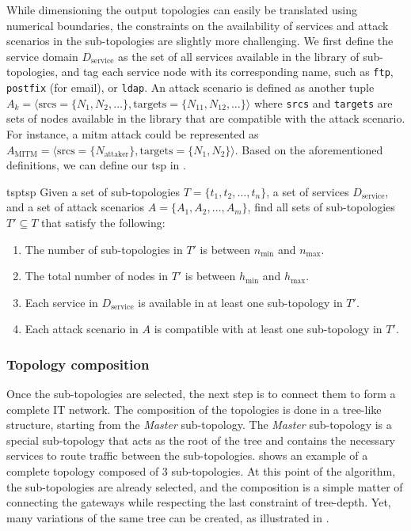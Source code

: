 While dimensioning the output topologies can easily be translated using numerical boundaries, the constraints on the availability of services and attack scenarios in the sub-topologies are slightly more challenging.
We first define the service domain $D_\text{service}$ as the set of all services available in the library of sub-topologies, and tag each service node with its corresponding name, such as \texttt{ftp}, \texttt{postfix} (for email), or \texttt{ldap}.
An attack scenario is defined as another tuple $A_k = \langle \text{srcs} = \{N_1, N_2, \ldots\}, \text{targets} = \{N_{11}, N_{12}, \ldots\} \rangle $ where \texttt{srcs} and \texttt{targets} are sets of nodes available in the library that are compatible with the attack scenario.
For instance, a \gls{mitm} attack could be represented as $A_\text{MITM} = \langle \text{srcs} = \lbrace N_\text{attaker} \rbrace, \text{targets} = \lbrace N_1, N_2 \rbrace \rangle $.
Based on the aforementioned definitions, we can define our \gls{tsp} in .

\begin{problembox}{\Acrfull{tsp}}{tsp}
  Given a set of sub-topologies $T = \{t_1, t_2, \ldots, t_n\}$, a set of services $D_\text{service}$, and a set of attack scenarios $A = \{A_1, A_2, \ldots, A_m\}$, find all sets of sub-topologies $T' \subseteq T$ that satisfy the following:
  \begin{enumerate}
    \item The number of sub-topologies in $T'$ is between $n_\text{min}$ and $n_\text{max}$.
    \item The total number of nodes in $T'$ is between $h_\text{min}$ and $h_\text{max}$. 
    \item Each service in $D_\text{service}$ is available in at least one sub-topology in $T'$.
    \item Each attack scenario in $A$ is compatible with at least one sub-topology in $T'$.
  \end{enumerate}
\end{problembox}

\subsubsection{Topology composition}

Once the sub-topologies are selected, the next step is to connect them to form a complete IT network.
The composition of the topologies is done in a tree-like structure, starting from the \emph{Master} sub-topology.
The \emph{Master} sub-topology is a special sub-topology that acts as the root of the tree and contains the necessary services to route traffic between the sub-topologies.
 shows an example of a complete topology composed of 3 sub-topologies.
At this point of the algorithm, the sub-topologies are already selected, and the composition is a simple matter of connecting the gateways while respecting the last constraint of tree-depth.
Yet, many variations of the same tree can be created, as illustrated in .

